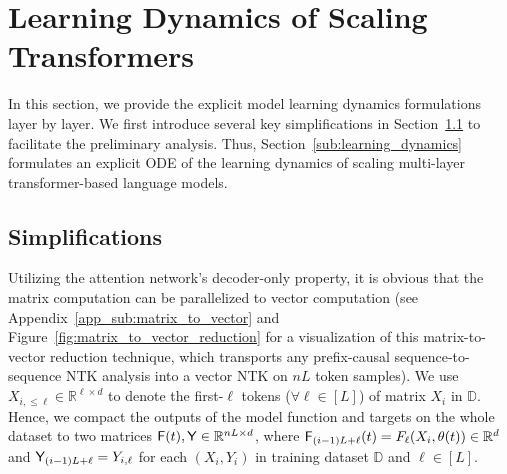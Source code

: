 \documentclass[11pt]{article}
\theoremstyle{plain}
\newcommand{\R}{\mathbb{R}}
\begin{document}
\section{Learning Dynamics of Scaling Transformers}\label{sec:learning_dynamics}


In this section, we provide the explicit model learning dynamics formulations layer by layer. 
We first introduce several key simplifications in Section~\ref{sub:simplification} to facilitate the preliminary analysis. Thus, Section~\ref{sub:learning_dynamics} formulates an explicit ODE of the learning dynamics of scaling multi-layer transformer-based language models.

\subsection{Simplifications}\label{sub:simplification}

Utilizing the attention network's decoder-only property, it is obvious that the matrix computation can be parallelized to vector computation (see Appendix~\ref{app_sub:matrix_to_vector} and Figure~\ref{fig:matrix_to_vector_reduction} for a visualization of this matrix-to-vector reduction technique, which transports any prefix-causal sequence-to-sequence NTK analysis into a vector NTK on $nL$ token samples). We use $X_{i, \leq \ell} \in \R^{\ell \times d}$ to denote the first-$\ell$ tokens ($\forall \ell \in [L]$) of matrix $X_i$ in $\mathbb{D}$. Hence, we compact the outputs of the model function and targets on the whole dataset to two matrices ${\sf F}(t), {\sf Y} \in \R^{nL \times d}$, where ${\sf F}_{(i-1)L+\ell}(t) = F_{\ell}(X_{i}, \theta(t)) \in \R^d$ and ${\sf Y}_{(i-1)L+\ell} = Y_{i, \ell}$ for each $(X_{i}, Y_i)$ in training dataset $\mathbb{D}$ and $\ell \in [L]$.
\end{document}
